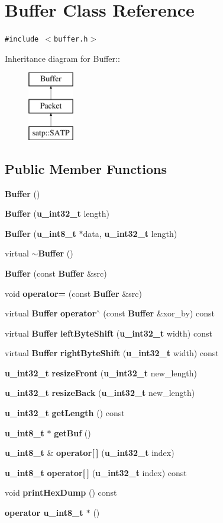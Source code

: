 \section{Buffer Class Reference}
\label{classBuffer}
{\tt \#include $<$buffer.h$>$}

Inheritance diagram for Buffer::\begin{figure}[H]
\begin{center}
\leavevmode
\includegraphics[height=3cm]{classBuffer}
\end{center}
\end{figure}
\subsection*{Public Member Functions}
\begin{CompactItemize}
\item 
{\bf Buffer} ()
\item 
{\bf Buffer} ({\bf u\_\-int32\_\-t} length)
\item 
{\bf Buffer} ({\bf u\_\-int8\_\-t} $\ast$data, {\bf u\_\-int32\_\-t} length)
\item 
virtual {\bf $\sim$Buffer} ()
\item 
{\bf Buffer} (const {\bf Buffer} \&src)
\item 
void {\bf operator=} (const {\bf Buffer} \&src)
\item 
virtual {\bf Buffer} {\bf operator$^\wedge$} (const {\bf Buffer} \&xor\_\-by) const 
\item 
virtual {\bf Buffer} {\bf left\-Byte\-Shift} ({\bf u\_\-int32\_\-t} width) const
\item 
virtual {\bf Buffer} {\bf right\-Byte\-Shift} ({\bf u\_\-int32\_\-t} width) const
\item 
{\bf u\_\-int32\_\-t} {\bf resize\-Front} ({\bf u\_\-int32\_\-t} new\_\-length)
\item 
{\bf u\_\-int32\_\-t} {\bf resize\-Back} ({\bf u\_\-int32\_\-t} new\_\-length)
\item 
{\bf u\_\-int32\_\-t} {\bf get\-Length} () const
\item 
{\bf u\_\-int8\_\-t} $\ast$ {\bf get\-Buf} ()
\item 
{\bf u\_\-int8\_\-t} \& {\bf operator[$\,$]} ({\bf u\_\-int32\_\-t} index)
\item 
{\bf u\_\-int8\_\-t} {\bf operator[$\,$]} ({\bf u\_\-int32\_\-t} index) const
\item 
void {\bf print\-Hex\-Dump} () const
\item 
{\bf operator u\_\-int8\_\-t $\ast$} ()
\end{CompactItemize}
